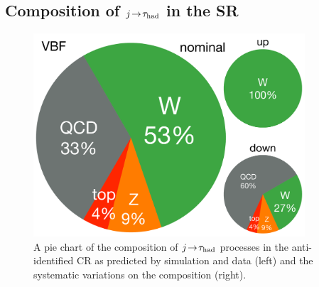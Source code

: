 \subsection{Composition of $j\!\rightarrow\!\tau_\text{had}$ in the SR}

\begin{figure}[tp]
  \centering
  \includegraphics[width=0.90\textwidth]{figures/backgrounds/rx-vbf}
  \caption{A pie chart of the composition of $j\!\rightarrow\!\tau_\text{had}$ processes in the anti-identified CR as predicted by simulation and data (left) and the systematic variations on the composition (right).}
  \label{fig:backgrounds-rx-vbf}
\end{figure}

\clearpage

